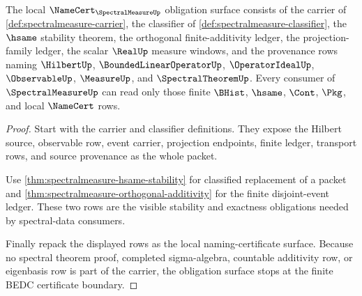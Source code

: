 \begin{theorem}
\label{thm:spectralmeasure-namecert-obligation-surface}
\label{thm:spectral-measure-namecert-obligations}
The local $\NameCert_{\SpectralMeasureUp}$ obligation surface consists of the carrier of \autoref{def:spectralmeasure-carrier}, the classifier of \autoref{def:spectralmeasure-classifier}, the $\hsame$ stability theorem, the orthogonal finite-additivity ledger, the projection-family ledger, the scalar $\RealUp$ measure windows, and the provenance rows naming $\HilbertUp$, $\BoundedLinearOperatorUp$, $\OperatorIdealUp$, $\ObservableUp$, $\MeasureUp$, and $\SpectralTheoremUp$. Every consumer of $\SpectralMeasureUp$ can read only those finite $\BHist$, $\hsame$, $\Cont$, $\Pkg$, and local $\NameCert$ rows.
\end{theorem}
\begin{proof}
Start with the carrier and classifier definitions. They expose the Hilbert source, observable row, event carrier, projection endpoints, finite ledger, transport rows, and source provenance as the whole packet.

Use \autoref{thm:spectralmeasure-hsame-stability} for classified replacement of a packet and \autoref{thm:spectralmeasure-orthogonal-additivity} for the finite disjoint-event ledger. These two rows are the visible stability and exactness obligations needed by spectral-data consumers.

Finally repack the displayed rows as the local naming-certificate surface. Because no spectral theorem proof, completed sigma-algebra, countable additivity row, or eigenbasis row is part of the carrier, the obligation surface stops at the finite BEDC certificate boundary.
\end{proof}

